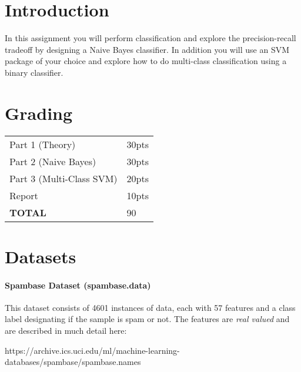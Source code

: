 \documentclass[12pt]{article}
\begin{document}
\maketitle


\section*{Introduction}
In this assignment you will perform classification and explore the precision-recall tradeoff by designing a Naive Bayes classifier.  In addition you will use an SVM package of your choice and explore how to do multi-class classification using a binary classifier.\\


\section*{Grading}
\begin{table}[h]
\begin{center}
\begin{tabular}{|l|l|}
\hline
Part 1 (Theory) & 30pts \\
Part 2 (Naive Bayes) & 30pts\\
Part 3 (Multi-Class SVM) & 20pts\\
Report & 10pts\\
\hline
\textbf{TOTAL} & 90\\
\hline
\end{tabular}
\end{center}
\end{table}

\newpage
\section*{Datasets}
\paragraph{Spambase Dataset  (spambase.data)}
This dataset consists of 4601 instances of data, each with 57 features and a class label designating if the sample is spam or not.
The features are \emph{real valued} and are described in much detail here:
\begin{center}
  https://archive.ics.uci.edu/ml/machine-learning-databases/spambase/spambase.names\\
\end{center}
\end{document}
